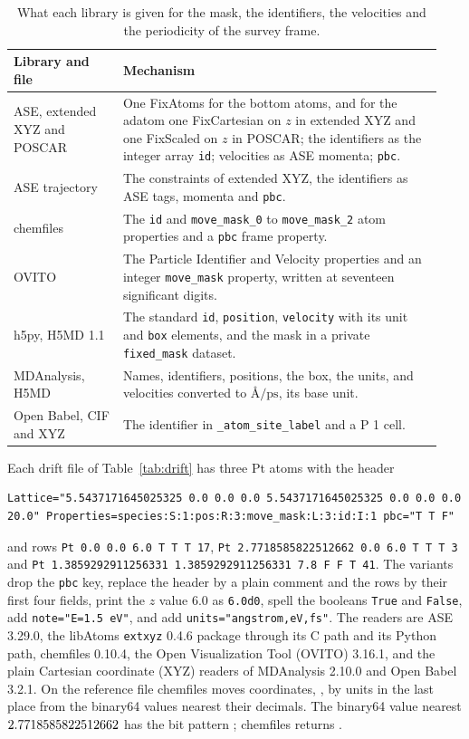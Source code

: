\documentclass[preprint,12pt]{elsarticle}
\begin{document}
\begin{table}[tbp] \centering \small \caption{What each library is given for the mask, the identifiers, the velocities and the periodicity of the survey frame.}
\label{tab:mechanisms}
\begin{tabular}{@{}p{0.24\linewidth}p{0.70\linewidth}@{}}
\toprule
Library and file & Mechanism \\
\midrule
ASE, extended XYZ and POSCAR & One FixAtoms for the bottom atoms, and for the adatom one FixCartesian on \(z\) in extended XYZ and one FixScaled on \(z\) in POSCAR; the identifiers as the integer array \texttt{id}; velocities as ASE momenta; \texttt{pbc}. \\
ASE trajectory & The constraints of extended XYZ, the identifiers as ASE tags, momenta and \texttt{pbc}. \\
chemfiles & The \texttt{id} and \texttt{move\_mask\_0} to \texttt{move\_mask\_2} atom properties and a \texttt{pbc} frame property. \\
OVITO & The Particle Identifier and Velocity properties and an integer \texttt{move\_mask} property, written at seventeen significant digits. \\
h5py, H5MD 1.1 & The standard \texttt{id}, \texttt{position}, \texttt{velocity} with its unit and \texttt{box} elements, and the mask in a private \texttt{fixed\_mask} dataset. \\
MDAnalysis, H5MD & Names, identifiers, positions, the box, the units, and velocities converted to \(\text{\AA}/\mathrm{ps}\), its base unit. \\
Open Babel, CIF and XYZ & The identifier in \texttt{\_atom\_site\_label} and a P 1 cell. \\
\bottomrule
\end{tabular}
\end{table}

Each drift file of Table~\ref{tab:drift} has three Pt atoms with the header
\begin{lstlisting}
Lattice="5.5437171645025325 0.0 0.0 0.0 5.5437171645025325 0.0 0.0 0.0 20.0" Properties=species:S:1:pos:R:3:move_mask:L:3:id:I:1 pbc="T T F"
\end{lstlisting}
and rows \texttt{Pt 0.0 0.0 6.0 T T T 17}, \texttt{Pt 2.7718585822512662 0.0 6.0 T T T 3} and \texttt{Pt 1.3859292911256331 1.3859292911256331 7.8 F F T 41}.
The variants drop the \texttt{pbc} key, replace the header by a plain comment and the rows by their first four fields, print the \(z\) value 6.0 as \texttt{6.0d0}, spell the booleans \texttt{True} and \texttt{False}, add \texttt{note="E=1.5 eV"}, and add \texttt{units="angstrom,eV,fs"}.
The readers are ASE 3.29.0, the libAtoms \texttt{extxyz} 0.4.6 package \cite{kermodeLibatomsExtxyzV0462026} through its C path and its Python path, chemfiles 0.10.4, the Open Visualization Tool (OVITO) 3.16.1, and the plain Cartesian coordinate (XYZ) readers of MDAnalysis 2.10.0 and Open Babel 3.2.1.
On the reference file chemfiles moves \driftChemMoved{} coordinates, \driftChemCoords{}, by \driftChemUlps{} units in the last place from the binary64 values nearest their decimals.
The binary64 value nearest \(2.7718585822512662\) has the bit pattern \texttt{\driftXOneBits}; chemfiles returns \texttt{\driftXOneChemBits}.
\end{document}
